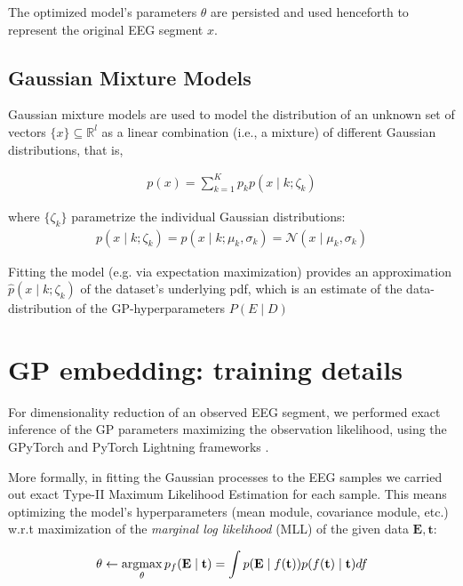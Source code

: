 The optimized model's parameters $\theta$ are persisted and used henceforth to represent the original EEG segment $x$.


\section{Gaussian Mixture Models}
\label{apx:GMM}
Gaussian mixture models \cite{theodoridis2015machine} are used to model the distribution of an unknown set of vectors $\{x\} \subseteq \mathbb{R}^l$ as a linear combination (i.e., a mixture) of different Gaussian distributions, that is,

\begin{align}
    p(x) = \sum_{k=1}^{K}p_kp(x \mid k; \zeta_k)
\end{align}

where $\{\zeta_k\}$ parametrize the individual Gaussian distributions:
\begin{align}
    p(x \mid k ; \zeta_k) = p(x \mid k; \mu_k, \sigma_k) = \mathcal{N}(x \mid \mu_k, \sigma_k)
\end{align}

Fitting the model (e.g. via expectation maximization) provides an approximation $\hat p(x \mid k; \zeta_k)$ of the dataset's underlying pdf, which is an estimate of the data-distribution of the GP-hyperparameters $P(E \mid D)$


\chapter{GP embedding: training details}
\label{apx:GPTraining}

For dimensionality reduction of an observed EEG segment, we performed exact inference of the GP parameters maximizing the observation likelihood, using the GPyTorch and PyTorch Lightning frameworks  \cite{gardner2018gpytorch, Falcon_PyTorch_Lightning_2019}.

More formally, in fitting the Gaussian processes to the EEG samples we carried out exact Type-II Maximum Likelihood Estimation for each sample. This means optimizing the model's hyperparameters (mean module, covariance module, etc.) w.r.t maximization of the \emph{marginal log likelihood} (MLL) of the given data $\mathbf{E, t}$:

\begin{align}
    \theta \gets \operatorname*{argmax}_\theta p_f(\mathbf{E} \mid \mathbf{t}) = \int p(\mathbf{E} \mid f(\mathbf{t})) p(f(\mathbf{t}) \mid \mathbf{t}) df
\end{align}

